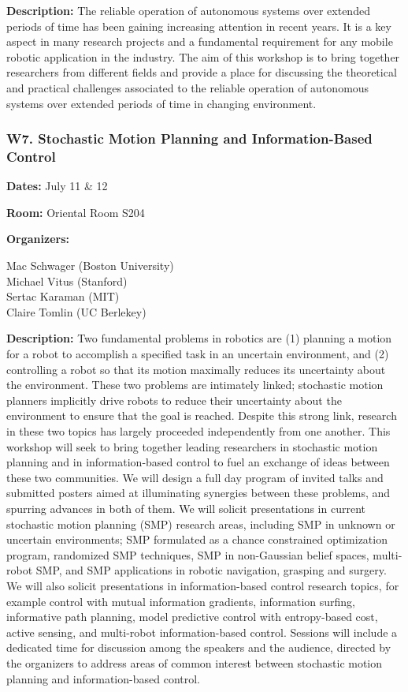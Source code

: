 \bigskip
{\bf Description:}
The reliable operation of autonomous systems over extended periods of time has been gaining increasing attention in recent years. It is a key aspect in many research projects and a fundamental requirement for any mobile robotic application in the industry. The aim of this workshop is to bring together researchers from different fields and provide a place for discussing the theoretical and practical challenges associated to the reliable operation of autonomous systems over extended periods of time in changing environment.


\subsubsection*{W7.   Stochastic Motion Planning and Information-Based Control}

{\bf Dates:} July 11 \& 12

{\bf Room:} Oriental Room S204

\bigskip
{\bf Organizers:}

Mac Schwager (Boston University)\\
Michael Vitus (Stanford)\\
Sertac Karaman (MIT)\\
Claire Tomlin (UC Berlekey)

\bigskip
{\bf Description:}
Two fundamental problems in robotics are (1) planning a motion for a
robot to accomplish a specified task in an uncertain environment, and
(2) controlling a robot so that its motion maximally reduces its
uncertainty about the environment. These two problems are intimately
linked; stochastic motion planners implicitly drive robots to reduce
their uncertainty about the environment to ensure that the goal is
reached. Despite this strong link, research in these two topics has
largely proceeded independently from one another. This workshop will
seek to bring together leading researchers in stochastic motion
planning and in information-based control to fuel an exchange of ideas
between these two communities. We will design a full day program of
invited talks and submitted posters aimed at illuminating synergies
between these problems, and spurring advances in both of them. We
will solicit presentations in current stochastic motion planning (SMP)
research areas, including SMP in unknown or uncertain environments;
SMP formulated as a chance constrained optimization program,
randomized SMP techniques, SMP in non-Gaussian belief spaces,
multi-robot SMP, and SMP applications in robotic navigation, grasping
and surgery. We will also solicit presentations in information-based
control research topics, for example control with mutual information
gradients, information surfing, informative path planning, model
predictive control with entropy-based cost, active sensing, and
multi-robot information-based control. Sessions will include a
dedicated time for discussion among the speakers and the audience,
directed by the organizers to address areas of common interest between
stochastic motion planning and information-based control.


